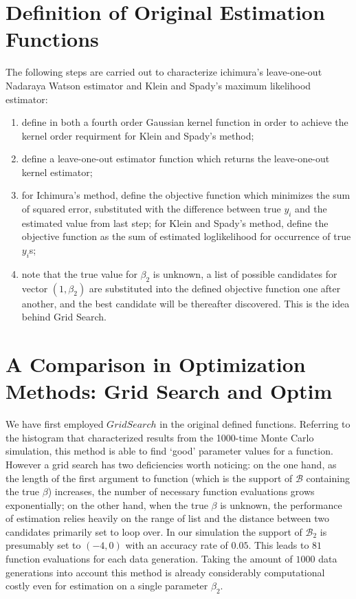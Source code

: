 \documentclass[a4paper]{article}
\begin{document}
\section{Definition of Original Estimation Functions} 
The following steps are carried out to characterize ichimura's leave-one-out Nadaraya Watson estimator and Klein and Spady's maximum likelihood estimator:
\begin{enumerate}
\item define in both a fourth order Gaussian kernel function in order to achieve the kernel order requirment for Klein and Spady's method;
\item define a leave-one-out estimator function which returns the leave-one-out kernel estimator;
\item for Ichimura's method, define the objective function which minimizes the sum of squared error, substituted with the difference between true $y_i$ and the estimated value from last step; for Klein and Spady's method, define the objective function as the sum of estimated loglikelihood for occurrence of true $y_i$s; 
\item note that the true value for $\beta_2$ is unknown, a list of possible candidates for vector $(1,\beta_2)$ are substituted into the defined objective function one after another, and the best candidate will be thereafter discovered. This is the idea behind Grid Search.
 
\end{enumerate}

\section{A Comparison in Optimization Methods: Grid Search and Optim}
We have first employed $Grid Search$ in the original defined functions. Referring to the histogram that characterized results from the 1000-time Monte Carlo simulation, this method is able to find `good' parameter values for a function. However a grid search has two deficiencies worth noticing: on the one hand, as the length of the first argument to function (which is the support of $\mathcal{B}$ containing the true $\beta$) increases, the number of necessary function evaluations grows exponentially; on the other hand, when the true $\beta$ is unknown, the performance of estimation relies heavily on the range of list and the distance between two candidates primarily set to loop over. In our simulation the support of $\mathcal{B}_2$ is presumably set to $(-4,0)$ with an accuracy rate of $0.05$. This leads to $81$ function evaluations for each data generation. Taking the amount of $1000$ data generations into account this method is already considerably computational costly even for estimation on a single parameter $\beta_2$. 
\end{document}
